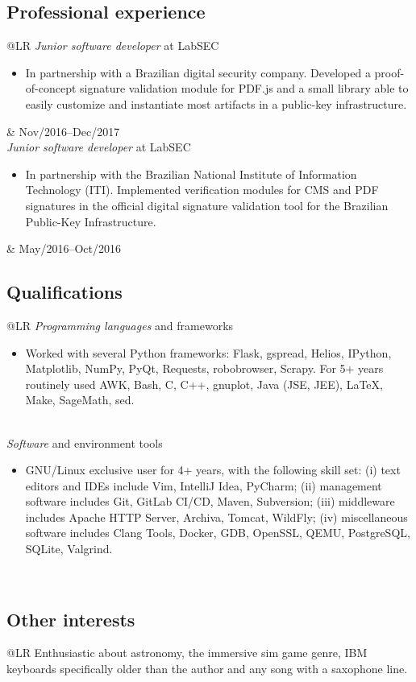 \documentclass[12pt]{article}
\makeatletter
\newenvironment{datetable}
  {\newcolumntype{R}{>{\raggedleft\arraybackslash}p{0.14\textwidth}}
   \newcolumntype{L}{p{0.82\textwidth}}
   \begin{tabular}{@{\hspace{0mm}}LR}}
  {\end{tabular}}
\newenvironment{contenttable}[1]
  {\subsection*{#1}
   \begin{datetable}}
  {\end{datetable}}
\makeatother
\begin{document}
\begin{contenttable}{Professional experience}
  \emph{Junior software developer} at LabSEC
  \begin{itemize}
    \item In partnership with a Brazilian digital security company. Developed a
        proof-of-concept signature validation module for PDF.js and a small
          library able to easily customize and instantiate most artifacts in a
          public-key infrastructure.
  \end{itemize} & Nov/2016--Dec/2017 \\

  \emph{Junior software developer} at LabSEC
  \begin{itemize}
    \item In partnership with the Brazilian National Institute of Information
        Technology (ITI). Implemented verification modules for CMS and PDF
          signatures in the official digital signature validation tool for the
          Brazilian Public-Key Infrastructure.
  \end{itemize} & May/2016--Oct/2016 \\
\end{contenttable}

\begin{contenttable}{Qualifications}
  \emph{Programming languages} and frameworks
  \begin{itemize}
    \item Worked with several Python frameworks: Flask, gspread,
        Helios, IPython, Matplotlib, NumPy, PyQt, Requests, robobrowser,
          Scrapy. For 5+ years routinely used AWK, Bash, C, C++, gnuplot, Java
          (JSE, JEE), \LaTeX{}, Make, SageMath, sed.
  \end{itemize} \\
  \emph{Software} and environment tools
  \begin{itemize}
    \item GNU/Linux exclusive user for 4+ years, with the following skill set:
        (i) text editors and IDEs include Vim, IntelliJ Idea, PyCharm; (ii)
          management software includes Git, GitLab CI/CD, Maven, Subversion;
          (iii) middleware includes Apache HTTP Server, Archiva, Tomcat,
          WildFly; (iv) miscellaneous software includes Clang Tools, Docker,
          GDB, OpenSSL, QEMU, PostgreSQL, SQLite, Valgrind.
  \end{itemize} \\
\end{contenttable}

\begin{contenttable}{Other interests}
  Enthusiastic about astronomy, the immersive sim game genre, IBM keyboards
    specifically older than the author and any song with a saxophone line. \\
\end{contenttable}


\nobibliography{\jobname}
\end{document}
